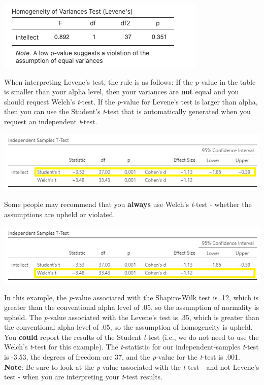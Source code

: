 \documentclass[
]{book}
\begin{document}
\includegraphics{img/LevenesTest.png}

When interpreting Levene's test, the rule is as follows: If the \emph{p}-value in the table is smaller than your alpha level, then your variances are \textbf{not} equal and you should request { Welch's} \emph{t}-test. If the \emph{p}-value for Levene's test is larger than alpha, then you can use the Student's \emph{t}-test that is automatically generated when you request an independent \emph{t}-test.

\includegraphics{img/IndependTTestResults2A.png}

Some people may recommend that you \textbf{always} use Welch's \emph{t}-test - whether the assumptions are upheld or violated.

\includegraphics{img/IndependTTestResults2B.png}

In this example, the \emph{p}-value associated with the Shapiro-Wilk test is .12, which is greater than the conventional alpha level of .05, so the assumption of normality is upheld. The \emph{p}-value associated with the Levene's test is .35, which is greater than the conventional alpha level of .05, so the assumption of homogeneity is upheld. You \textbf{could} report the results of the Student \emph{t}-test (i.e., we do not need to use the Welch's \emph{t}-test for this example). The \emph{t}-statistic for our independent-samples \emph{t}-test is -3.53, the degrees of freedom are 37, and the \emph{p}-value for the \emph{t}-test is .001. \textbf{Note}: Be sure to look at the \emph{p}-value associated with the \emph{t}-test - and not Levene's test - when you are interpreting your \emph{t}-test results.
\end{document}
